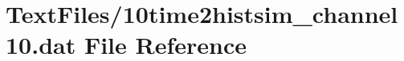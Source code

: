 \hypertarget{10time2histsim__channel10_8dat}{}\section{Text\+Files/10time2histsim\+\_\+channel10.dat File Reference}
\label{10time2histsim__channel10_8dat}
